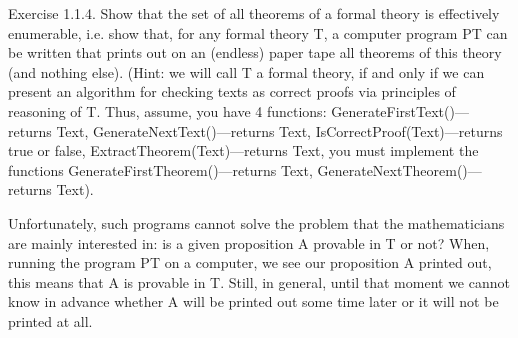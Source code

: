Exercise 1.1.4. Show that the set of all theorems of a formal theory is effectively enumerable, i.e.  show that, for any formal theory T, a computer program PT can be written that prints out on an (endless) paper tape all theorems of this theory (and nothing else). (Hint: we will call T a formal theory, if and only if we can present an algorithm for checking texts as correct proofs via principles of reasoning of T. Thus, assume, you have 4 functions: GenerateFirstText()---returns Text, GenerateNextText()---returns Text, IsCorrectProof(Text)---returns true or false, ExtractTheorem(Text)---returns Text, you must implement the functions GenerateFirstTheorem()---returns Text, GenerateNextTheorem()---returns Text).

Unfortunately, such programs cannot solve the problem that the mathematicians are mainly interested in: is a given proposition A provable in T or not? When, running the program PT on a computer, we see our proposition A printed out, this means that A is provable in T. Still, in general, until that moment we cannot know in advance whether A will be printed out some time later or it will not be printed at all.

